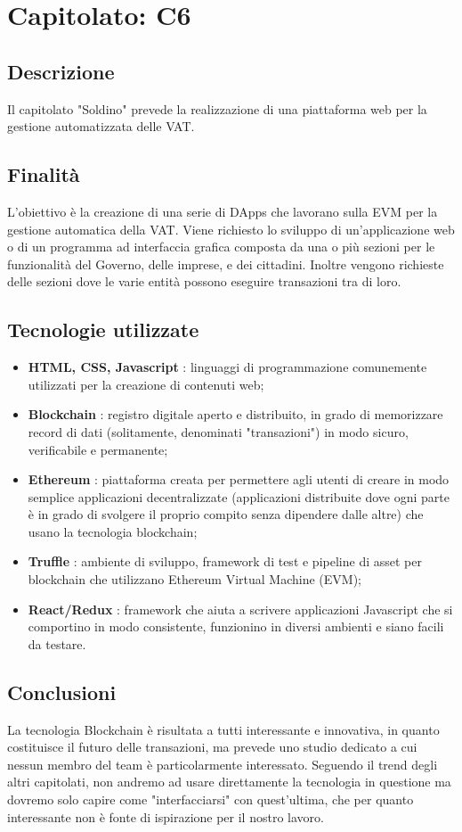 \section{Capitolato: C6}
	\subsection{Descrizione}
		Il capitolato "Soldino" prevede la realizzazione di una piattaforma web per la gestione automatizzata delle VAT.
	\subsection{Finalità}
		L'obiettivo è la creazione di una serie di DApps che lavorano sulla EVM per la gestione automatica della VAT.
		Viene richiesto lo sviluppo di un'applicazione web o di un programma ad interfaccia grafica composta da una o più sezioni per le funzionalità del Governo, delle imprese, e dei cittadini. Inoltre vengono richieste delle sezioni dove le varie entità possono eseguire transazioni tra di loro.
	\subsection{Tecnologie utilizzate}
		\begin{itemize}
			\item \textbf{HTML, CSS, Javascript} : linguaggi di programmazione comunemente utilizzati per la creazione di contenuti web;
			\item \textbf{Blockchain} : registro digitale aperto e distribuito, in grado di memorizzare record di dati (solitamente, denominati "transazioni") in modo sicuro, verificabile e permanente;
			\item \textbf{Ethereum} : piattaforma creata per permettere agli utenti di creare in modo semplice applicazioni decentralizzate (applicazioni distribuite dove ogni parte è in grado di svolgere il proprio compito senza dipendere dalle altre) che usano la tecnologia blockchain;
			\item \textbf{Truffle} : ambiente di sviluppo, framework di test e pipeline di asset per blockchain che utilizzano Ethereum Virtual Machine (EVM);
			\item \textbf{React/Redux} : framework che aiuta a scrivere applicazioni Javascript che si comportino in modo consistente, funzionino in diversi ambienti e siano facili da testare.
		\end{itemize}
	\subsection{Conclusioni}
		La tecnologia Blockchain è risultata a tutti interessante e innovativa, in quanto costituisce il futuro delle transazioni, ma prevede uno studio dedicato a cui nessun membro del team è particolarmente interessato. Seguendo il trend degli altri capitolati, non andremo ad usare direttamente la tecnologia in questione ma dovremo solo capire come "interfacciarsi" con quest'ultima, che per quanto interessante non è fonte di ispirazione per il nostro lavoro.
